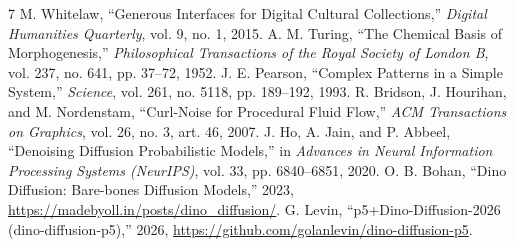 \documentclass[journal,compsoc]{IEEEtran}
\begin{document}
\begin{thebibliography}{7}
 M. Whitelaw, ``Generous Interfaces for Digital Cultural Collections,'' \emph{Digital Humanities Quarterly}, vol. 9, no. 1, 2015.
 A. M. Turing, ``The Chemical Basis of Morphogenesis,'' \emph{Philosophical Transactions of the Royal Society of London B}, vol. 237, no. 641, pp. 37--72, 1952.
 J. E. Pearson, ``Complex Patterns in a Simple System,'' \emph{Science}, vol. 261, no. 5118, pp. 189--192, 1993.
 R. Bridson, J. Hourihan, and M. Nordenstam, ``Curl-Noise for Procedural Fluid Flow,'' \emph{ACM Transactions on Graphics}, vol. 26, no. 3, art. 46, 2007.
 J. Ho, A. Jain, and P. Abbeel, ``Denoising Diffusion Probabilistic Models,'' in \emph{Advances in Neural Information Processing Systems (NeurIPS)}, vol. 33, pp. 6840--6851, 2020.
 O. B. Bohan, ``Dino Diffusion: Bare-bones Diffusion Models,'' 2023, \url{https://madebyoll.in/posts/dino_diffusion/}.
 G. Levin, ``p5+Dino-Diffusion-2026 (dino-diffusion-p5),'' 2026, \url{https://github.com/golanlevin/dino-diffusion-p5}.
\end{thebibliography}
\end{document}
